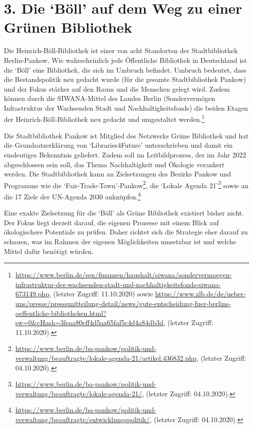 \documentclass[a4paper,
fontsize=11pt,
oneside,
numbers=noperiodatend,
parskip=half-,
bibliography=totoc,
final
]{scrartcl}
\begin{document}
\hypertarget{die-buxf6ll-auf-dem-weg-zu-einer-gruxfcnen-bibliothek}{%
\section{\texorpdfstring{3. Die \enquote*{Böll} auf dem Weg zu
einer Grünen
Bibliothek}{3. Die `Böll' auf dem Weg zu einer Grünen Bibliothek}}\label{die-buxf6ll-auf-dem-weg-zu-einer-gruxfcnen-bibliothek}}

Die Heinrich-Böll-Bibliothek ist einer von acht Standorten der
Stadtbibliothek Berlin-Pankow. Wie wahrscheinlich jede Öffentliche
Bibliothek in Deutschland ist die \enquote*{Böll} eine Bibliothek, die
sich im Umbruch befindet. Umbruch bedeutet, dass die Bestandspolitik neu
gedacht wurde (für die gesamte Stadtbibliothek Pankow) und der Fokus
stärker auf den Raum und die Menschen gelegt wird. Zudem können durch
die SIWANA-Mittel des Landes Berlin (Sondervermögen Infrastruktur der
Wachsenden Stadt und Nachhaltigkeitsfonds) die beiden Etagen der
Heinrich-Böll-Bibliothek neu gedacht und umgestaltet werden.\footnote{\url{https://www.berlin.de/sen/finanzen/haushalt/siwana/sondervermoegen-infrastruktur-der-wachsenden-stadt-und-nachhaltigkeitsfonds-siwana-673149.php},
  (letzter Zugriff: 11.10.2020) sowie
  \url{https://www.zlb.de/de/ueber-uns/presse/pressemitteilung-detail/news/gute-entscheidung-fuer-berlins-oeffentliche-bibliotheken.html?sw=0\&cHash=3feaa80eff4d5aa65faf5c4d4a84db3d},
  (letzter Zugriff: 11.10.2020).}

Die Stadtbibliothek Pankow ist Mitglied des Netzwerks Grüne Bibliothek
und hat die Grundsatzerklärung von \enquote*{Libraries4Future}
unterschrieben und damit ein eindeutiges Bekenntnis geliefert. Zudem
soll im Leitbildprozess, der im Jahr 2022 abgeschlossen sein soll, das
Thema Nachhaltigkeit und Ökologie verankert werden. Die Stadtbibliothek
kann an Zielsetzungen des Bezirks Pankow und Programme wie die
\enquote*{Fair-Trade-Town}-Pankow\footnote{\url{https://www.berlin.de/ba-pankow/politik-und-verwaltung/beauftragte/lokale-agenda-21/artikel.436832.php},
  (letzter Zugriff: 04.10.2020).}, die \enquote*{Lokale Agenda
21}\footnote{\url{https://www.berlin.de/ba-pankow/politik-und-verwaltung/beauftragte/lokale-agenda-21/},
  (letzter Zugriff: 04.10.2020).} sowie an die 17 Ziele der UN-Agenda
2030 anknüpfen.\footnote{\url{https://www.berlin.de/ba-pankow/politik-und-verwaltung/beauftragte/entwicklungspolitik/},
  (letzter Zugriff: 04.10.2020).}

Eine exakte Zielsetzung für die \enquote*{Böll} als Grüne Bibliothek
existiert bisher nicht. Der Fokus liegt derzeit darauf, die eigenen
Prozesse mit einem Blick auf ökologischere Potentiale zu prüfen. Daher
richtet sich die Strategie eher darauf zu schauen, was im Rahmen der
eigenen Möglichkeiten umsetzbar ist und welche Mittel dafür benötigt
würden.
\end{document}
